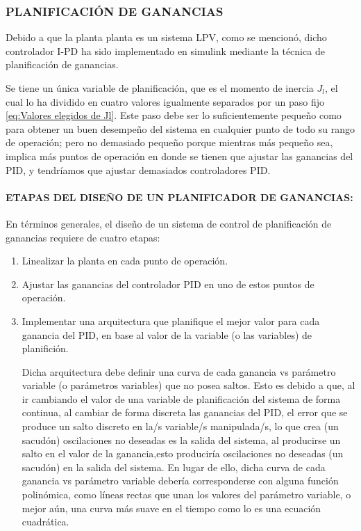 \documentclass{article}
\begin{document}
\begin{sloppypar}
\subsubsection{PLANIFICACIÓN DE GANANCIAS}
\label{sec:PLANIFICACIÓN DE GANANCIAS}

Debido a que la planta planta es un sistema LPV, como se mencionó, dicho controlador I-PD ha sido implementado en simulink mediante la técnica de planificación de ganancias.

Se tiene un única variable de planificación, que es el momento de inercia $J_l$, el cual lo ha dividido en cuatro valores igualmente separados por un paso fijo \ref{eq:Valores elegidos de Jl}. Este paso debe ser lo suficientemente pequeño como para obtener un buen desempeño del sistema en cualquier punto de todo su rango de operación; pero no demasiado pequeño porque mientras más pequeño sea, implica más puntos de operación en donde se tienen que ajustar las ganancias del PID, y tendríamos que ajustar demasiados controladores PID.

\paragraph{ETAPAS DEL DISEÑO DE UN PLANIFICADOR DE GANANCIAS:}
\label{sec:ETAPAS DEL DISEÑO DE UN PLANIFICADOR DE GANANCIAS:}
\hfill

\hfill

En términos generales, el diseño de un sistema de control de planificación de ganancias requiere de cuatro etapas:
\begin{enumerate}
    \item Linealizar la planta en cada punto de operación.
    \item Ajustar las ganancias del controlador PID en uno de estos puntos de operación.
    \item Implementar una arquitectura que planifique el mejor valor para cada ganancia del PID, en base al valor de la variable (o las variables) de planifición.

    Dicha arquitectura debe definir una curva de cada ganancia vs parámetro variable (o parámetros variables) que no posea saltos. Esto es debido a que, al ir cambiando el valor de una variable de planificación del sistema de forma continua, al cambiar de forma discreta las ganancias del PID, el error que se produce un salto discreto en la/s variable/s manipulada/s, lo que crea (un sacudón) oscilaciones no deseadas es la salida del sistema, al producirse un salto en el valor de la ganancia,esto produciría oscilaciones no deseadas (un sacudón) en la salida del sistema.
    En lugar de ello, dicha curva de cada ganancia vs parámetro variable debería corresponderse con alguna función polinómica, como líneas rectas que unan los valores del parámetro variable, o mejor aún, una curva más suave en el tiempo como  lo es una ecuación cuadrática.


\end{enumerate}
\end{sloppypar}
\end{document}
